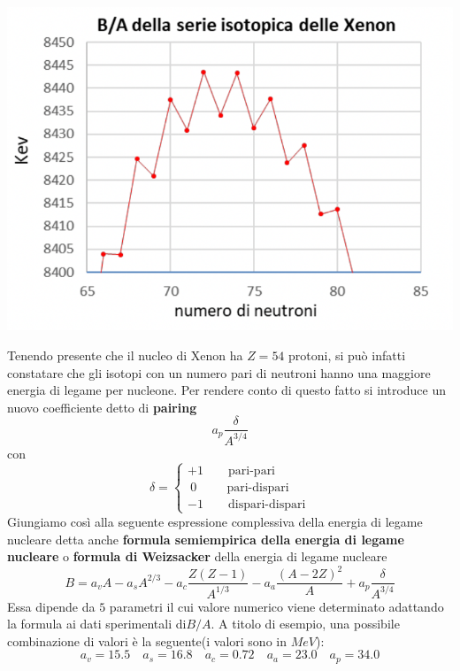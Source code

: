 \begin{marginfigure}
    \includegraphics[scale = 1.5]{figs/goccia5}
    \label{fig:goccia5}
\end{marginfigure}
Tenendo presente che il nucleo di Xenon ha \(Z=54\) protoni, si può
infatti constatare che gli isotopi con un numero pari di neutroni hanno
una maggiore energia di legame per nucleone.
Per rendere conto di questo
fatto si introduce un nuovo coefficiente detto di \textbf{pairing} \[
                                                                       a_{p} \frac{\delta}{A^{3/4}}
\] con \[
           \delta =
           \begin{cases}
               +1    \qquad  \text{pari-pari}   \\
               \ 0  \qquad  \ \ \text{pari-dispari}   \\
               -1  \qquad  \text{dispari-dispari}
           \end{cases}
\] Giungiamo così alla seguente espressione complessiva della energia di
legame nucleare detta anche \textbf{formula semiempirica della energia
di legame nucleare} o \textbf{formula di Weizsacker} della energia di
legame nucleare \begin{equation}
                    \boxed{    B = a_{v}A - a_{s}A^{2/3} - a_{c} \frac{Z(Z-1)}{A^{1/3}} - a_{a}\frac{(A-2Z)^{2}}{A} +     a_{p} \frac{\delta}{A^{3/4}}}
\end{equation} Essa dipende da \(5\) parametri il cui valore numerico
viene determinato adattando la formula ai dati sperimentali di\(B/A\).
A
titolo di esempio, una possibile combinazione di valori è la seguente(i
valori sono in \(MeV\)): \[
                             a_{v} = 15.5 \quad a_{s} = 16.8 \quad a_{c} = 0.72 \quad a_{a} = 23.0 \quad a_{p} = 34.0
\]

